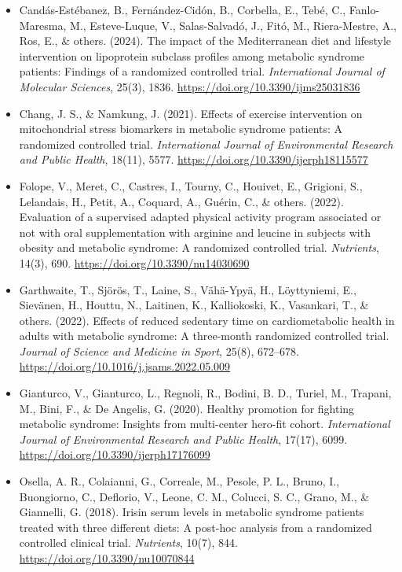 \begin{itemize}
    \item Candás-Estébanez, B., Fernández-Cidón, B., Corbella, E., Tebé, C., Fanlo-Maresma, M., Esteve-Luque, V., Salas-Salvadó, J., Fitó, M., Riera-Mestre, A., Ros, E., \& others. (2024). The impact of the Mediterranean diet and lifestyle intervention on lipoprotein subclass profiles among metabolic syndrome patients: Findings of a randomized controlled trial. \textit{International Journal of Molecular Sciences}, 25(3), 1836. \url{https://doi.org/10.3390/ijms25031836}

    \item Chang, J. S., \& Namkung, J. (2021). Effects of exercise intervention on mitochondrial stress biomarkers in metabolic syndrome patients: A randomized controlled trial. \textit{International Journal of Environmental Research and Public Health}, 18(11), 5577. \url{https://doi.org/10.3390/ijerph18115577}

    \item Folope, V., Meret, C., Castres, I., Tourny, C., Houivet, E., Grigioni, S., Lelandais, H., Petit, A., Coquard, A., Guérin, C., \& others. (2022). Evaluation of a supervised adapted physical activity program associated or not with oral supplementation with arginine and leucine in subjects with obesity and metabolic syndrome: A randomized controlled trial. \textit{Nutrients}, 14(3), 690. \url{https://doi.org/10.3390/nu14030690}

    \item Garthwaite, T., Sjörös, T., Laine, S., Vähä-Ypyä, H., Löyttyniemi, E., Sievänen, H., Houttu, N., Laitinen, K., Kalliokoski, K., Vasankari, T., \& others. (2022). Effects of reduced sedentary time on cardiometabolic health in adults with metabolic syndrome: A three-month randomized controlled trial. \textit{Journal of Science and Medicine in Sport}, 25(8), 672–678. \url{https://doi.org/10.1016/j.jsams.2022.05.009}

    \item Gianturco, V., Gianturco, L., Regnoli, R., Bodini, B. D., Turiel, M., Trapani, M., Bini, F., \& De Angelis, G. (2020). Healthy promotion for fighting metabolic syndrome: Insights from multi-center hero-fit cohort. \textit{International Journal of Environmental Research and Public Health}, 17(17), 6099. \url{https://doi.org/10.3390/ijerph17176099}

    \item Osella, A. R., Colaianni, G., Correale, M., Pesole, P. L., Bruno, I., Buongiorno, C., Deflorio, V., Leone, C. M., Colucci, S. C., Grano, M., \& Giannelli, G. (2018). Irisin serum levels in metabolic syndrome patients treated with three different diets: A post-hoc analysis from a randomized controlled clinical trial. \textit{Nutrients}, 10(7), 844. \url{https://doi.org/10.3390/nu10070844}


\end{itemize}
